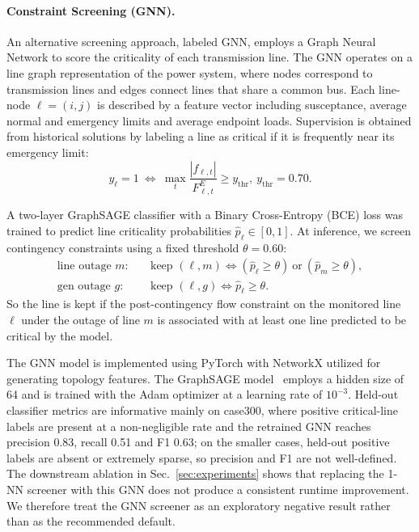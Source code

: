\documentclass[runningheads]{llncs}
\begin{document}
\paragraph{Constraint Screening (GNN).}

An alternative screening approach, labeled GNN, employs a Graph Neural Network to score the criticality of each transmission line. The GNN operates on a line graph representation of the power system, where nodes correspond to transmission lines and edges connect lines that share a common bus. Each line-node $\ell=(i,j)$ is described by a feature vector including susceptance, average normal and emergency limits and average endpoint loads.
Supervision is obtained from historical solutions by labeling a line as critical if it is frequently near its
emergency limit:
\begin{equation}
y_\ell= 1\ \iff\ \max_t \frac{|f_{\ell,t}|}{F^E_{\ell,t}} \ge y_{\mathrm{thr}},\ y_{\mathrm{thr}}=0.70.
\end{equation}

A two-layer GraphSAGE classifier with a Binary Cross-Entropy (BCE) loss was trained to predict line criticality probabilities
$\hat p_\ell\in[0,1]$.
At inference, we screen contingency constraints using a fixed threshold $\theta=0.60$:
\begin{align}
\text{line outage } m:\quad &\text{keep }(\ell,m)\iff (\hat p_\ell\ge\theta)\ \text{or}\ (\hat p_m\ge\theta),\\
\text{gen outage } g:\quad  &\text{keep }(\ell,g)\iff \hat p_\ell\ge\theta.
\end{align}
So the line is kept if the post-contingency flow constraint on the monitored line $\ell$ under the outage of line $m$ is associated with at least one line predicted to be critical by the model.

The GNN model is implemented using PyTorch with NetworkX utilized for generating topology features. The GraphSAGE model~\cite{Hamilton2017} employs a hidden size of 64 and is trained with the Adam optimizer at a learning rate of $10^{-3}$.
Held-out classifier metrics are informative mainly on case300, where positive critical-line labels are present at a non-negligible rate and the retrained GNN reaches precision 0.83, recall 0.51 and F1 0.63; on the smaller cases, held-out positive labels are absent or extremely sparse, so precision and F1 are not well-defined. The downstream ablation in Sec.~\ref{sec:experiments} shows that replacing the 1-NN screener with this GNN does not produce a consistent runtime improvement. We therefore treat the GNN screener as an exploratory negative result rather than as the recommended default.
\end{document}

